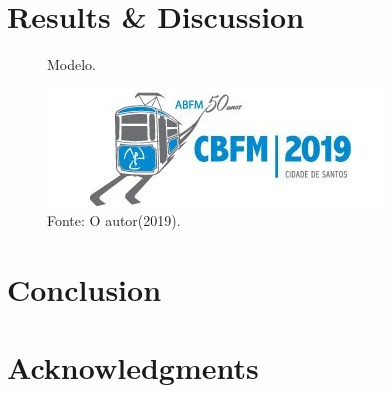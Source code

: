\documentclass[10pt,twoside,twocolumn]{article}
\begin{document}
\section{Results \& Discussion}

\lipsum

\begin{figure}[!ht]
    \caption{Modelo.}
    \label{fig:img1}
	\begin{center}
		\includegraphics[scale=.56]{heads/CBFM_head.jpg}
	\end{center}
	\caption*{Fonte: O autor(2019).}
\end{figure}




\section{Conclusion}

\lipsum

\section*{Acknowledgments}

\lipsum

\small{

}
\end{document}
